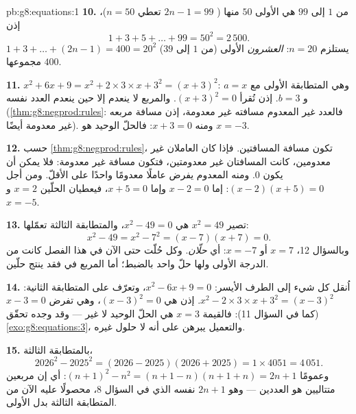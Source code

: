\begin{solution}{pb:g8:equations:1}
\textbf{10.}  من $1$ إلى $99$ هي الأولى $50$
منها ( $2n - 1 = 99$ تعطي $n = 50$)، إذن
\[
1 + 3 + 5 + \dots + 99 = 50^2 = 2\,500 .
\]
 $1 + 3 + \dots + (2n - 1) = 400 = 20^2$ يستلزم $n = 20$:
 \emph{العشرون} الأولى (من $1$ إلى $39$) مجموعها
$400$.

\textbf{11.} $x^2 + 6x + 9 = x^2 + 2 \times 3 \times x + 3^2 =
(x + 3)^2$: وهي المتطابقة الأولى مع $a = x$ و $b = 3$. إذن تُقرأ
 $(x + 3)^2 = 0$. والمربع لا ينعدم إلا حين ينعدم
العدد نفسه (\cref{thm:g8:negprod:rules}: فالعدد غير المعدوم
مسافته غير معدومة، إذن مسافة مربعه غير معدومة
أيضًا). ومنه $x + 3 = 0$: فالحلّ الوحيد هو $x = -3$.

\textbf{12.} حسب \cref{thm:g8:negprod:rules}، تكون مسافة
  المسافتين. فإذا كان العاملان
غير معدومين، كانت المسافتان غير معدومتين، فتكون مسافة 
غير معدومة: فلا يمكن  أن يكون $0$. ومنه  المعدوم
يفرض عاملًا معدومًا واحدًا على الأقلّ. ومن أجل $(x - 2)(x + 5) = 0$: إما
$x - 2 = 0$ وإما $x + 5 = 0$، فيعطيان الحلّين $x = 2$ و
$x = -5$.

\textbf{13.} تصير $x^2 = 49$ هي $x^2 - 49 = 0$، والمتطابقة
الثالثة تعمّلها:
\[
x^2 - 49 = x^2 - 7^2 = (x - 7)(x + 7) = 0 .
\]
وبالسؤال 12، $x = 7$ أو $x = -7$: أي \emph{حلّان}. وكل
 حُلّت حتى الآن في هذا الفصل كانت من الدرجة الأولى ولها
حلّ واحد بالضبط؛ أما المربع في  فقد ينتج
حلّين.

\textbf{14.} اُنقل كل شيء إلى الطرف الأيسر:
$x^2 - 6x + 9 = 0$، وتعرّف على المتطابقة الثانية:
$x^2 - 2 \times 3 \times x + 3^2 = (x - 3)^2$. إذن  هي
$(x - 3)^2 = 0$، وهي تفرض $x - 3 = 0$ (كما في السؤال 11):
فالقيمة $x = 3$ هي الحلّ الوحيد لا غير --- وقد وجده تحقّق
\cref{exo:g8:equations:3}، والتعميل يبرهن
على أنه لا حلول غيره.

\textbf{15.} بالمتطابقة الثالثة،
\[
2026^2 - 2025^2 = (2026 - 2025)(2026 + 2025)
= 1 \times 4051 = 4\,051 .
\]
وعمومًا $(n+1)^2 - n^2 = (n + 1 - n)(n + 1 + n) = 2n + 1$: أي إن
 مربعين متتاليين هو  العددين
--- وهو $2n + 1$ نفسه الذي في السؤال 8، محصولًا عليه الآن من
المتطابقة الثالثة بدل الأولى.
\end{solution}
